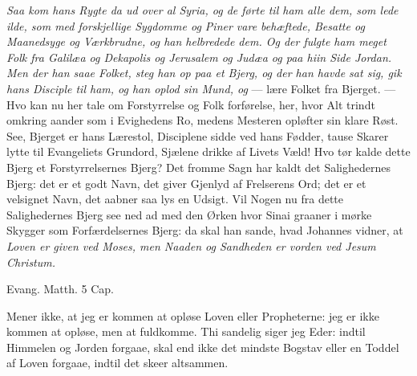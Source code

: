 \documentclass[12pt,a4paper]{book}
\begin{document}
\emph{Saa kom hans Rygte da ud over al Syria, og de førte til ham alle dem, som lede
ilde, som med forskjellige Sygdomme og Piner vare behæftede, Besatte og Maanedsyge og
Værkbrudne, og han helbredede dem. Og der fulgte ham meget Folk fra Galilæa og
Dekapolis og Jerusalem og Judæa og paa hiin Side Jordan. Men der han saae Folket, steg
han op paa et Bjerg, og der han havde sat sig, gik hans Disciple til ham, og han oplod
sin Mund, og} --- lære Folket fra Bjerget. --- Hvo kan nu her tale om Forstyrrelse og
Folk forførelse, her, hvor Alt trindt omkring aander som i Evighedens Ro, medens
Mesteren opløfter sin klare Røst. See, Bjerget er hans Lærestol, Disciplene sidde ved
hans Fødder, tause Skarer lytte til Evangeliets Grundord, Sjælene drikke af Livets
Væld! Hvo tør kalde dette Bjerg et Forstyrrelsernes Bjerg? Det fromme Sagn har kaldt
det Salighedernes Bjerg: det er et godt Navn, det giver Gjenlyd af Frelserens Ord; det
er et velsignet Navn, det aabner saa lys en Udsigt. Vil Nogen nu fra dette
Salighedernes Bjerg see ned ad med den Ørken hvor Sinai graaner i mørke Skygger som
Forfærdelsernes Bjerg: da skal han sande, hvad Johannes vidner, at \emph{Loven er given
ved Moses, men Naaden og Sandheden er vorden ved Jesum Christum.}

Evang. Matth. 5 Cap.

\begingroup\large
Mener ikke, at jeg er kommen at opløse Loven eller Propheterne: jeg er ikke kommen at
opløse, men at fuldkomme. Thi sandelig siger jeg Eder: indtil Himmelen og Jorden
forgaae, skal end ikke det mindste Bogstav eller en Toddel af Loven forgaae, indtil det
skeer altsammen.
\par\endgroup
\end{document}
